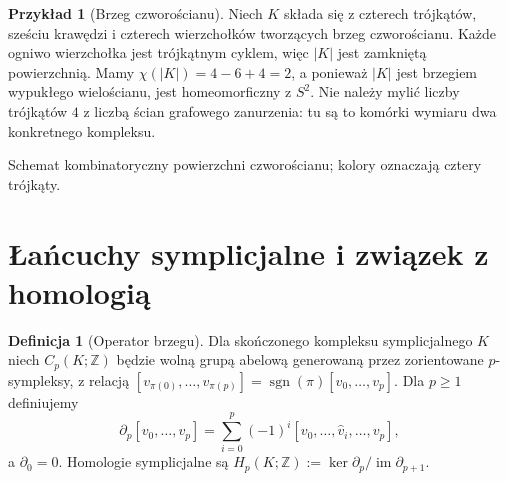 \documentclass[11pt,a4paper]{report}
\numberwithin{equation}{section}
\theoremstyle{plain}
\theoremstyle{definition}
\newtheorem{definicja}[twierdzenie]{Definicja}
\newtheorem{przyklad}[twierdzenie]{Przykład}
\theoremstyle{remark}
\begin{document}
\begin{przyklad}[Brzeg czworościanu]
Niech $K$ składa się z czterech trójkątów, sześciu krawędzi
i czterech wierzchołków tworzących brzeg czworościanu.
Każde ogniwo wierzchołka jest trójkątnym cyklem, więc
$|K|$ jest zamkniętą powierzchnią. Mamy
$\chi(|K|)=4-6+4=2$, a ponieważ $|K|$ jest brzegiem
wypukłego wielościanu, jest homeomorficzny z $S^2$.
Nie należy mylić liczby trójkątów $4$ z liczbą ścian
grafowego zanurzenia: tu są to komórki wymiaru dwa
konkretnego kompleksu.
\end{przyklad}

\begin{samepage}
\begin{center}
\begin{minipage}{.96\linewidth}\centering
{}\par\smallskip

{\footnotesize Schemat kombinatoryczny powierzchni czworościanu;
kolory oznaczają cztery trójkąty.}
\end{minipage}
\end{center}
\end{samepage}

\section{Łańcuchy symplicjalne i związek z homologią}
\label{sec:tg-simplicial-chain}

\begin{definicja}[Operator brzegu]
Dla skończonego kompleksu symplicjalnego $K$ niech
$C_p(K;\mathbb Z)$ będzie wolną grupą abelową generowaną
przez zorientowane $p$-sympleksy, z relacją
$[v_{\pi(0)},\ldots,v_{\pi(p)}]
=\operatorname{sgn}(\pi)[v_0,\ldots,v_p]$.
Dla $p\ge1$ definiujemy
\[
\partial_p[v_0,\ldots,v_p]
=\sum_{i=0}^p(-1)^i
[v_0,\ldots,\widehat v_i,\ldots,v_p],
\]
a $\partial_0=0$. Homologie symplicjalne są
$H_p(K;\mathbb Z):=\ker\partial_p/\operatorname{im}\partial_{p+1}$.
\end{definicja}
\end{document}
